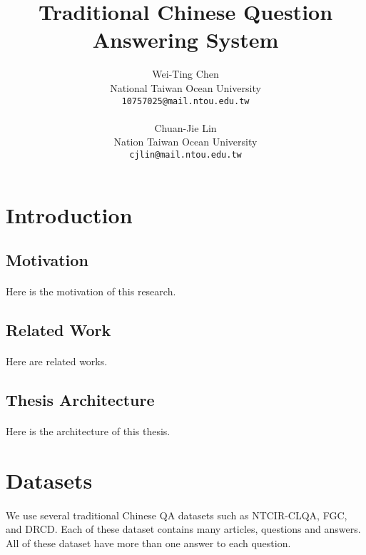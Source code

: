 \documentclass{article}
\title{Traditional Chinese Question Answering System}
\author{
  Wei-Ting Chen\\
  National Taiwan Ocean University\\
  \texttt{10757025@mail.ntou.edu.tw}\\
  \\
  Chuan-Jie Lin\\
  Nation Taiwan Ocean University\\
  \texttt{cjlin@mail.ntou.edu.tw}\\
}
\begin{document}
\maketitle
{}

\newpage

\doublespacing
\tableofcontents
\singlespacing

\newpage

\section{Introduction}

\subsection{Motivation}
\paragraph{}
Here is the motivation of this research.

\subsection{Related Work}
\paragraph{}
Here are related works.

\subsection{Thesis Architecture}
\paragraph{}
Here is the architecture of this thesis.

\section{Datasets}
\paragraph{}
We use several traditional Chinese QA datasets such as NTCIR-CLQA, FGC, and DRCD. Each of these dataset contains many articles, questions and answers. All of these dataset have more than one answer to each question.
\end{document}

